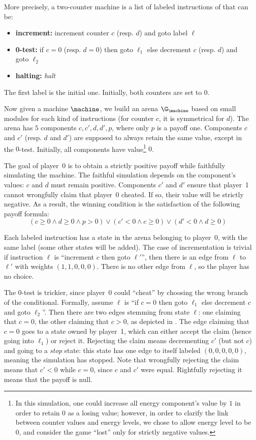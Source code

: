 More precisely, a two-counter machine is a list of labeled instructions of that can be:
\begin{itemize}
    \item \textbf{increment:} increment counter $c$ (resp. $d$) and goto label $\ell$
    \item \textbf{0-test:} if $c=0$ (resp. $d=0$) then goto $\ell_1$ else decrement $c$ (resp. $d$) and goto $\ell_2$
    \item \textbf{halting:} \emph{halt}
\end{itemize}
The first label is the initial one.
Initially, both counters are set to $0$.

Now given a machine $\machine$, we build an arena $\G_\machine$ based on small modules for each kind of instructions (for counter $c$, it is symmetrical for $d$).
The arena has $5$ components $c,c',d,d',p$, where only $p$ is a payoff one.
Components $c$ and $c'$ (resp. $d$ and $d'$) are supposed to always retain the same value, except in the $0$-test.
Initially, all components have value\footnote{In this simulation, one could increase all energy component's value by $1$ in order to retain $0$ as a losing value; however, in order to clarify the link between counter values and energy levels, we chose to allow energy level to be $0$, and consider the game ``lost'' only for strictly negative values.} $0$.

The goal of player~0 is to obtain a strictly positive payoff while faithfully simulating the machine.
The faithful simulation depends on the component's values: $c$ and $d$ must remain positive.
Components $c'$ and $d'$ ensure that player~1 cannot wrongfully claim that player~0 cheated.
If so, their value will be strictly negative.
As a result, the winning condition is the satisfaction of the following payoff formula:
\[(c\geq0 \wedge d\geq0 \wedge p>0) \vee (c'<0 \wedge c\geq0) \vee (d'<0 \wedge d\geq0)\]

Each labeled instruction has a state in the arena belonging to player~0, with the same label (some other states will be added).
The case of incrementation is trivial if instruction $\ell$ is ``increment $c$ then goto $\ell'$'', then there is an edge from $\ell$ to $\ell'$ with weights $(1,1,0,0,0)$.
There is no other edge from $\ell$, so the player has no choice.

The $0$-test is trickier, since player~0 could ``cheat'' by choosing the wrong branch of the conditional.
Formally, assume $\ell$ is ``if $c=0$ then goto $\ell_1$ else decrement $c$ and goto $\ell_2$''.
Then there are two edges stemming from state $\ell$: one claiming that $c=0$, the other claiming that $c>0$, as depicted in .
The edge claiming that $c=0$ goes to a state owned by player~1, which can either accept the claim (hence going into $\ell_1$) or reject it.
Rejecting the claim means decrementing $c'$ (but not $c$) and going to a \emph{stop} state: this state has one edge to itself labeled $(0,0,0,0,0)$, meaning the simulation has stopped.
Note that wrongfully rejecting the claim means that $c'<0$ while $c=0$, since $c$ and $c'$ were equal.
Rightfully rejecting it means that the payoff is null.


